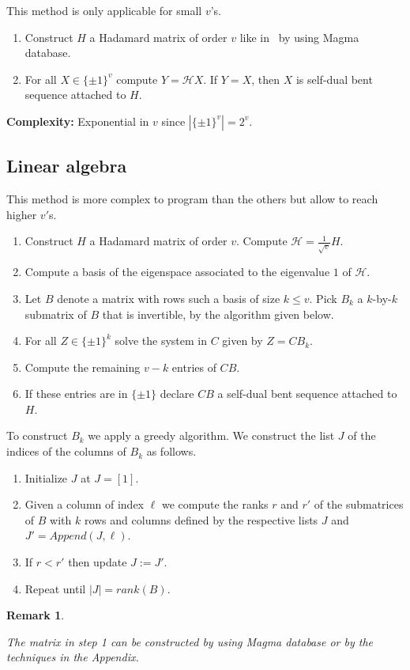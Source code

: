 \documentclass[12pt]{article}
\newtheorem{rem}{Remark}
\begin{document}
This method is only applicable for small $v$'s.

\begin{enumerate}
 \item[\rm(1)] Construct $H$ a  Hadamard matrix of order $v$ like in~\cite{SCGR:2021isit} by using Magma database.
 \item[\rm(2)] For all $X \in \{\pm 1\}^v$ compute $Y=\mathcal{H}X$. If $Y=X$, then $X$ is self-dual bent sequence attached to $H$.
\end{enumerate}
{\bf Complexity:} Exponential in $v$ since $| \{\pm 1\}^v|=2^v$.

\subsection{Linear algebra}
\label{sec:search:lin}

This method is more complex to program than the others but allow to reach higher $v'$s.
\begin{enumerate}

\item [\rm(1)] Construct $H$ a Hadamard matrix of order $v.$ %
Compute $\mathcal{H}=\frac{1}{\sqrt{v}}H.$
\item [\rm(2)] Compute a basis of the eigenspace associated to the eigenvalue $1$ of $\mathcal{H}$.
\item [\rm(3)] Let $B$ denote a matrix with rows such a basis of size $k \le  v$. Pick $B_k$ a $k$-by-$k$  submatrix of $B$ that is invertible, by the algorithm given below.
\item [\rm(4)] For all  $Z \in \{\pm 1\}^k$ solve the system in $C$ given by $Z=CB_k$.
\item [\rm(5)] Compute the remaining $v-k$ entries
 of $CB$.
\item [\rm(6)] If these entries are in $\{\pm 1\}$ declare $CB$  a self-dual bent sequence attached to $H$.
\end{enumerate}

To construct $B_k$ we apply a greedy algorithm. We construct the list $J$ of the indices of the columns of $B_k$ as follows.

\begin{enumerate}
 \item [\rm(i)] Initialize $J$ at $J=[1]$.
 \item [\rm(ii)] Given a column of index $\ell$ we compute the ranks $r$ and $r'$ of the submatrices of $B$ with $k$ rows and columns defined by the respective lists $J$ and $J'=Append(J,\ell)$.
 \item [\rm(iii)] If $r<r'$ then update $J:=J'$.
 \item [\rm(iv)] Repeat until $|J|=rank(B)$.
\end{enumerate}
\begin{rem}
{\em 

  The matrix in step 1 can be constructed by using Magma database or by the techniques in the Appendix.
  }
\end{rem}
\end{document}
